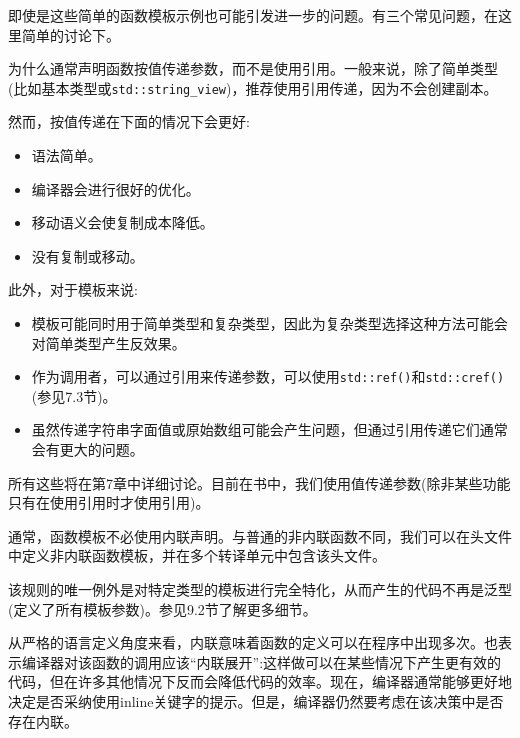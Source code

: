 即使是这些简单的函数模板示例也可能引发进一步的问题。有三个常见问题，在这里简单的讨论下。


为什么通常声明函数按值传递参数，而不是使用引用。一般来说，除了简单类型(比如基本类型或\texttt{std::string\_view})，推荐使用引用传递，因为不会创建副本。

然而，按值传递在下面的情况下会更好:

\begin{itemize}
\item
语法简单。

\item 
编译器会进行很好的优化。

\item
移动语义会使复制成本降低。

\item 
没有复制或移动。
\end{itemize}

此外，对于模板来说:

\begin{itemize}
\item
模板可能同时用于简单类型和复杂类型，因此为复杂类型选择这种方法可能会对简单类型产生反效果。

\item 
作为调用者，可以通过引用来传递参数，可以使用\texttt{std::ref()}和\texttt{std::cref()}(参见7.3节)。

\item
虽然传递字符串字面值或原始数组可能会产生问题，但通过引用传递它们通常会有更大的问题。
\end{itemize}

所有这些将在第7章中详细讨论。目前在书中，我们使用值传递参数(除非某些功能只有在使用引用时才使用引用)。

 
通常，函数模板不必使用内联声明。与普通的非内联函数不同，我们可以在头文件中定义非内联函数模板，并在多个转译单元中包含该头文件。

该规则的唯一例外是对特定类型的模板进行完全特化，从而产生的代码不再是泛型(定义了所有模板参数)。参见9.2节了解更多细节。
 
从严格的语言定义角度来看，内联意味着函数的定义可以在程序中出现多次。也表示编译器对该函数的调用应该“内联展开”:这样做可以在某些情况下产生更有效的代码，但在许多其他情况下反而会降低代码的效率。现在，编译器通常能够更好地决定是否采纳使用inline关键字的提示。但是，编译器仍然要考虑在该决策中是否存在内联。

